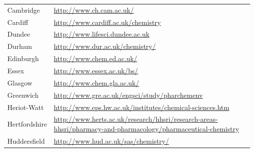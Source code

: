 \begin{table}[H]
\begin{tabular}{||p{2.5cm}|Y||}
 \footnotesize{Cambridge             }             & \footnotesize{\url{http://www.ch.cam.ac.uk/}}                                                                                                             \\
 \footnotesize{Cardiff              }              & \footnotesize{\url{http://www.cardiff.ac.uk/chemistry}}                                                                                                   \\
 \footnotesize{Dundee              }               & \footnotesize{\url{http://www.lifesci.dundee.ac.uk}}                                                                                                      \\
 \footnotesize{Durham             }                & \footnotesize{\url{http://www.dur.ac.uk/chemistry/}}                                                                                                      \\
 \footnotesize{Edinburgh         }                 & \footnotesize{\url{http://www.chem.ed.ac.uk/}}                                                                                                            \\
 \footnotesize{Essex            }                  & \footnotesize{\url{http://www.essex.ac.uk/bs/}                                                                                                          } \\
 \footnotesize{Glasgow         }                   & \footnotesize{\url{http://www.chem.gla.ac.uk/}}                                                                                                           \\
 \footnotesize{Greenwich      }                    & \footnotesize{\url{http://www.gre.ac.uk/engsci/study/pharchemenv}}                                                                                        \\
 \footnotesize{Heriot-Watt   }                     & \footnotesize{\url{http://www.eps.hw.ac.uk/institutes/chemical-sciences.htm}}                                                                             \\
 \footnotesize{Hertfordshire}                      & \footnotesize{\url{http://www.herts.ac.uk/research/hhsri/research-areas-hhsri/pharmacy-and-pharmacology/pharmaceutical-chemistry}}                        \\
 \footnotesize{Huddersfield}                       & \footnotesize{\url{http://www.hud.ac.uk/sas/chemistry/}}                                                                                                  \\

\end{tabular}
\end{table}
